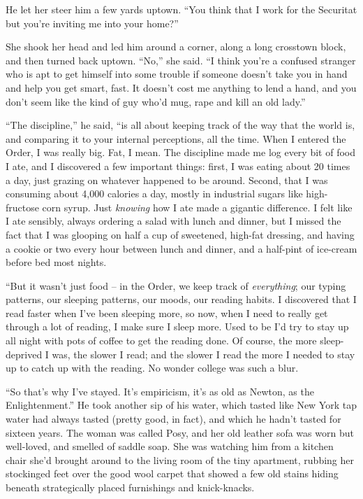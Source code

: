 He let her steer him a few yards uptown. “You think that I work for 
the Securitat but you're inviting me into your home?”

She shook her head and led him around a corner, along a long crosstown 
block, and then turned back uptown. “No,” she said. “I think 
you're a confused stranger who is apt to get himself into some trouble 
if someone doesn't take you in hand and help you get smart, fast. It 
doesn't cost me anything to lend a hand, and you don't seem like the 
kind of guy who'd mug, rape and kill an old lady.”

\tb

“The discipline,” he said, “is all about keeping track of the way 
that the world is, and comparing it to your internal perceptions, all 
the time. When I entered the Order, I was really big. Fat, I mean. The 
discipline made me log every bit of food I ate, and I discovered a few 
important things: first, I was eating about 20 times a day, just 
grazing on whatever happened to be around. Second, that I was consuming 
about 4,000 calories a day, mostly in industrial sugars like 
high-fructose corn syrup. Just \emph{knowing} how I ate made a gigantic 
difference. I felt like I ate sensibly, always ordering a salad with 
lunch and dinner, but I missed the fact that I was glooping on half a 
cup of sweetened, high-fat dressing, and having a cookie or two every 
hour between lunch and dinner, and a half-pint of ice-cream before bed 
most nights.

“But it wasn't just food -- in the Order, we keep track of 
\emph{everything}; our typing patterns, our sleeping patterns, our 
moods, our reading habits. I discovered that I read faster when I've 
been sleeping more, so now, when I need to really get through a lot of 
reading, I make sure I sleep more. Used to be I'd try to stay up all 
night with pots of coffee to get the reading done. Of course, the more 
sleep-deprived I was, the slower I read; and the slower I read the more 
I needed to stay up to catch up with the reading. No wonder college was 
such a blur.

“So that's why I've stayed. It's empiricism, it's as old as Newton, 
as the Enlightenment.” He took another sip of his water, which tasted 
like New York tap water had always tasted (pretty good, in fact), and 
which he hadn't tasted for sixteen years. The woman was called Posy, 
and her old leather sofa was worn but well-loved, and smelled of saddle 
soap. She was watching him from a kitchen chair she'd brought around to 
the living room of the tiny apartment, rubbing her stockinged feet over 
the good wool carpet that showed a few old stains hiding beneath 
strategically placed furnishings and knick-knacks.

